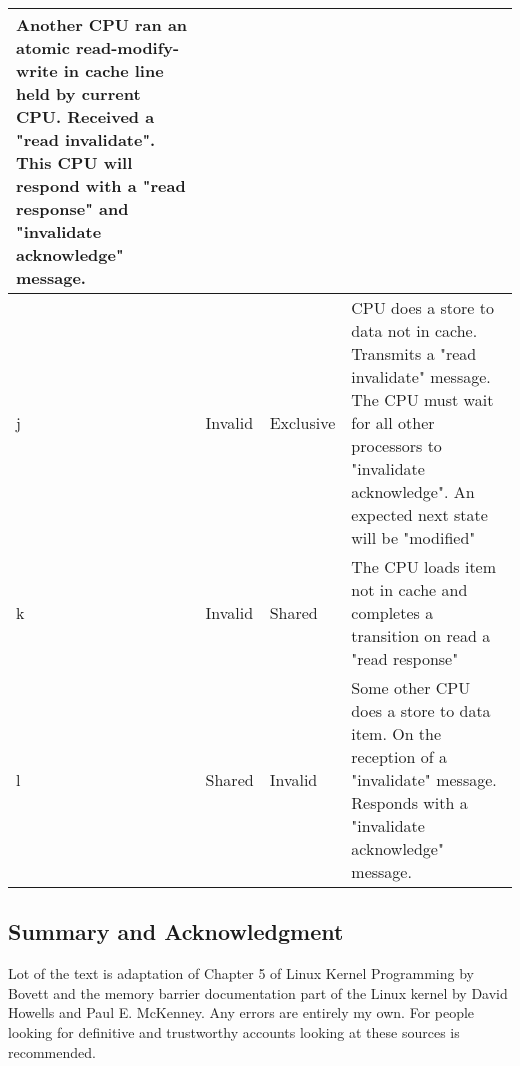 \documentclass{article}
\begin{document}
\begin{center}
\begin{tabular} {| l | l | l | p{9cm}| }
    Another CPU ran an atomic read-modify-write in cache line held by
    current CPU. Received a "read invalidate". This CPU will respond
    with a "read response" and "invalidate acknowledge" message.   \\

    \hline

    j & Invalid & Exclusive &

    CPU does a store to data not in cache. Transmits a "read
    invalidate" message. The CPU must wait for all other processors to
    "invalidate acknowledge". An expected next state will be
    "modified"  
    \\
    \hline

    k & Invalid & Shared &
    
    The CPU loads item not in cache and completes a transition on read
    a "read response"     \\


    \hline
    l & Shared & Invalid &
    
    Some other CPU does a store to data item. On the reception of a
    "invalidate" message. Responds with a "invalidate acknowledge"
    message. \\

    \hline    
\end{tabular}
\end{center}




\subsection{Summary and Acknowledgment}

Lot of the text is adaptation of Chapter 5 of Linux Kernel Programming
by Bovett and the memory barrier documentation part of the Linux
kernel by David Howells and Paul E. McKenney. Any errors are entirely
my own. For people looking for definitive and trustworthy accounts
looking at these sources is recommended.
\end{document}

